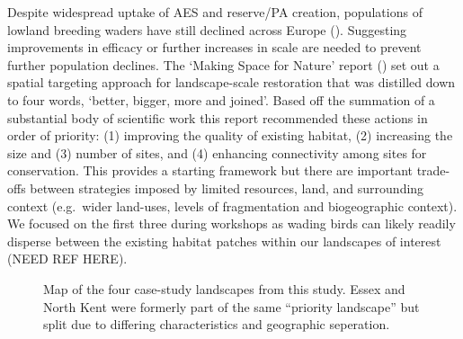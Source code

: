 \documentclass[
  12pt,
  letterpaper,
  DIV=11,
  numbers=noendperiod]{scrartcl}
\begin{document}
Despite widespread uptake of AES and reserve/PA creation, populations of
lowland breeding waders have still declined across Europe
(). Suggesting improvements
in efficacy or further increases in scale are needed to prevent further
population declines. The `Making Space for Nature' report
() set out a spatial
targeting approach for landscape-scale restoration that was distilled
down to four words, `better, bigger, more and joined'. Based off the
summation of a substantial body of scientific work this report
recommended these actions in order of priority: (1) improving the
quality of existing habitat, (2) increasing the size and (3) number of
sites, and (4) enhancing connectivity among sites for conservation. This
provides a starting framework but there are important trade-offs between
strategies imposed by limited resources, land, and surrounding context
(e.g.~wider land-uses, levels of fragmentation and biogeographic
context). We focused on the first three during workshops as wading birds
can likely readily disperse between the existing habitat patches within
our landscapes of interest (NEED REF HERE).

\begin{figure}[H]


\caption{\label{fig-landscapes}Map of the four case-study landscapes
from this study. Essex and North Kent were formerly part of the same
``priority landscape'' but split due to differing characteristics and
geographic seperation.}

\end{figure}%
\end{document}
